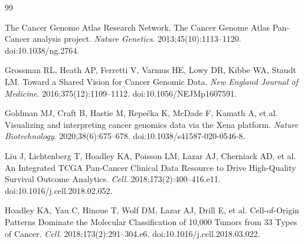 \documentclass[11pt]{article}
\begin{document}
\begin{thebibliography}{99}

The Cancer Genome Atlas Research Network.
\newblock The Cancer Genome Atlas Pan-Cancer analysis project.
\newblock \emph{Nature Genetics}. 2013;45(10):1113--1120.
\newblock doi:10.1038/ng.2764.

Grossman RL, Heath AP, Ferretti V, Varmus HE, Lowy DR, Kibbe WA, Staudt LM.
\newblock Toward a Shared Vision for Cancer Genomic Data.
\newblock \emph{New England Journal of Medicine}. 2016;375(12):1109--1112.
\newblock doi:10.1056/NEJMp1607591.

Goldman MJ, Craft B, Hastie M, Repe\v{c}ka K, McDade F, Kamath A, et al.
\newblock Visualizing and interpreting cancer genomics data via the Xena platform.
\newblock \emph{Nature Biotechnology}. 2020;38(6):675--678.
\newblock doi:10.1038/s41587-020-0546-8.

Liu J, Lichtenberg T, Hoadley KA, Poisson LM, Lazar AJ, Cherniack AD, et al.
\newblock An Integrated TCGA Pan-Cancer Clinical Data Resource to Drive High-Quality Survival Outcome Analytics.
\newblock \emph{Cell}. 2018;173(2):400--416.e11.
\newblock doi:10.1016/j.cell.2018.02.052.

Hoadley KA, Yau C, Hinoue T, Wolf DM, Lazar AJ, Drill E, et al.
\newblock Cell-of-Origin Patterns Dominate the Molecular Classification of 10,000 Tumors from 33 Types of Cancer.
\newblock \emph{Cell}. 2018;173(2):291--304.e6.
\newblock doi:10.1016/j.cell.2018.03.022.

\end{thebibliography}
\end{document}
